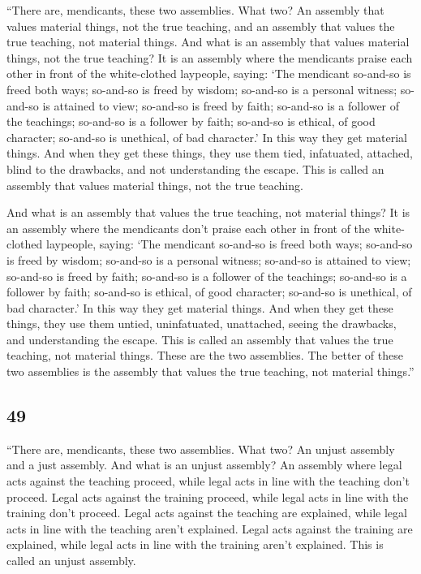 \documentclass[12pt,openany]{book}%
\begin{document}
“There are, mendicants, these two assemblies. What two? An assembly that values material things, not the true teaching, and an assembly that values the true teaching, not material things. And what is an assembly that values material things, not the true teaching? It is an assembly where the mendicants praise each other in front of the white-clothed laypeople, saying: ‘The mendicant so-and-so is freed both ways; so-and-so is freed by wisdom; so-and-so is a personal witness; so-and-so is attained to view; so-and-so is freed by faith; so-and-so is a follower of the teachings; so-and-so is a follower by faith; so-and-so is ethical, of good character; so-and-so is unethical, of bad character.’ In this way they get material things. And when they get these things, they use them tied, infatuated, attached, blind to the drawbacks, and not understanding the escape. This is called an assembly that values material things, not the true teaching. 

And what is an assembly that values the true teaching, not material things? It is an assembly where the mendicants don’t praise each other in front of the white-clothed laypeople, saying: ‘The mendicant so-and-so is freed both ways; so-and-so is freed by wisdom; so-and-so is a personal witness; so-and-so is attained to view; so-and-so is freed by faith; so-and-so is a follower of the teachings; so-and-so is a follower by faith; so-and-so is ethical, of good character; so-and-so is unethical, of bad character.’ In this way they get material things. And when they get these things, they use them untied, uninfatuated, unattached, seeing the drawbacks, and understanding the escape. This is called an assembly that values the true teaching, not material things. These are the two assemblies. The better of these two assemblies is the assembly that values the true teaching, not material things.” 

\subsection*{49 }

“There are, mendicants, these two assemblies. What two? An unjust assembly and a just assembly. And what is an unjust assembly? An assembly where legal acts against the teaching proceed, while legal acts in line with the teaching don’t proceed. Legal acts against the training proceed, while legal acts in line with the training don’t proceed. Legal acts against the teaching are explained, while legal acts in line with the teaching aren’t explained. Legal acts against the training are explained, while legal acts in line with the training aren’t explained. This is called an unjust assembly. 
\end{document}

